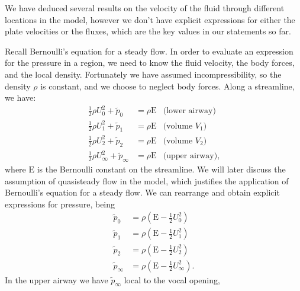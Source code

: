 
We have deduced several results on the velocity of the fluid through different locations in the model,
however we don't have explicit expressions for either the plate velocities or the fluxes,
which are the key values in our statements so far.

Recall Bernoulli's equation for a steady flow.
In order to evaluate an expression for the pressure in a region,
we need to know the fluid velocity, the body forces, and the local density.
Fortunately we have assumed incompressibility, so the density $\rho$ is constant,
and we choose to neglect body forces.
Along a streamline, we have:
\begin{equation}
    \begin{aligned}
        \frac{1}{2}\rho U_0^2 + \tilde{p}_0 &= \rho\mathrm{E} &\text{(lower airway)}\\
        \frac{1}{2}\rho U_1^2 + \tilde{p}_1 &= \rho\mathrm{E} &\text{(volume $V_1$)}  \\
        \frac{1}{2}\rho U_2^2 + \tilde{p}_2 &= \rho\mathrm{E} &\text{(volume $V_2$)}  \\
        \frac{1}{2}\rho U_\infty^2 + \tilde{p}_\infty &= \rho\mathrm{E} &\text{(upper airway)},
    \end{aligned}
\end{equation}
where $\mathrm{E}$ is the Bernoulli constant on the streamline.
We will later discuss the assumption of quasisteady flow in the model,
which justifies the application of Bernoulli's equation for a steady flow.
We can rearrange and obtain explicit expressions for pressure, being
\begin{equation}
    \begin{aligned}
        \tilde{p}_0 &= \rho\left(\mathrm{E} - \frac{1}{2}U_0^2\right) \\
        \tilde{p}_1 &= \rho\left(\mathrm{E} - \frac{1}{2}U_1^2\right) \\
        \tilde{p}_2 &= \rho\left(\mathrm{E} - \frac{1}{2}U_2^2\right) \\
        \tilde{p}_\infty &= \rho\left(\mathrm{E} - \frac{1}{2}U_\infty^2\right).
    \end{aligned}
\end{equation}
In the upper airway we have $\tilde{p}_\infty$ local to the vocal opening,
